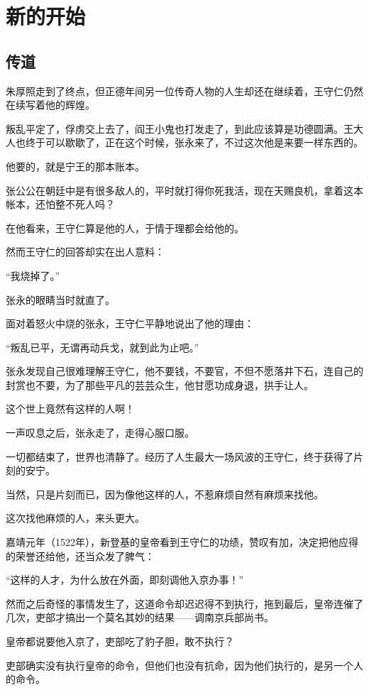 \section{新的开始}
\ifnum{}
	\begin{multicols}{\theparacolNo}
		\fi
		\subsection{传道}
		朱厚照走到了终点，但正德年间另一位传奇人物的人生却还在继续着，王守仁仍然在续写着他的辉煌。

		叛乱平定了，俘虏交上去了，阎王小鬼也打发走了，到此应该算是功德圆满。王大人也终于可以歇歇了，正在这个时候，张永来了，不过这次他是来要一样东西的。

		他要的，就是宁王的那本账本。

		张公公在朝廷中是有很多敌人的，平时就打得你死我活，现在天赐良机，拿着这本帐本，还怕整不死人吗？

		在他看来，王守仁算是他的人，于情于理都会给他的。

		然而王守仁的回答却实在出人意料：

		“我烧掉了。”

		张永的眼睛当时就直了。

		面对着怒火中烧的张永，王守仁平静地说出了他的理由：

		“叛乱已平，无谓再动兵戈，就到此为止吧。”

		张永发现自己很难理解王守仁，他不要钱，不要官，不但不愿落井下石，连自己的封赏也不要，为了那些平凡的芸芸众生，他甘愿功成身退，拱手让人。

		这个世上竟然有这样的人啊！

		一声叹息之后，张永走了，走得心服口服。

		一切都结束了，世界也清静了。经历了人生最大一场风波的王守仁，终于获得了片刻的安宁。

		当然，只是片刻而已，因为像他这样的人，不惹麻烦自然有麻烦来找他。

		这次找他麻烦的人，来头更大。

		嘉靖元年（1522年），新登基的皇帝看到王守仁的功绩，赞叹有加，决定把他应得的荣誉还给他，还当众发了脾气：

		“这样的人才，为什么放在外面，即刻调他入京办事！”

		然而之后奇怪的事情发生了，这道命令却迟迟得不到执行，拖到最后，皇帝连催了几次，吏部才搞出一个莫名其妙的结果——调南京兵部尚书。

		皇帝都说要他入京了，吏部吃了豹子胆，敢不执行？

		吏部确实没有执行皇帝的命令，但他们也没有抗命，因为他们执行的，是另一个人的命令。


\end{multicols}
